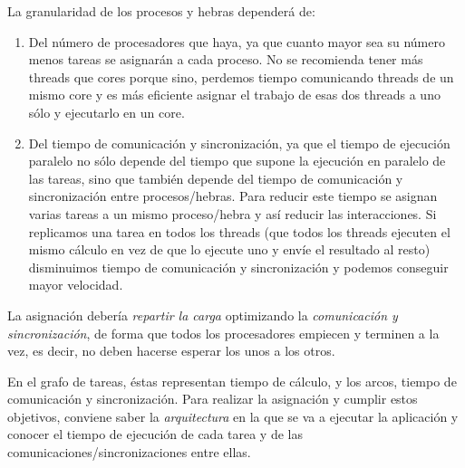 \documentclass[10pt,a4paper,spanish]{report}
\begin{document}
La granularidad de los procesos y hebras dependerá de:
\begin{enumerate}[\color{azul}{\bf $\heartsuit$}]
    \item Del número de procesadores que haya, ya que cuanto mayor sea su número menos tareas se asignarán a cada proceso. No se recomienda tener más threads que cores porque sino, perdemos tiempo comunicando threads de un mismo core y es más eficiente asignar el trabajo de esas dos threads a uno sólo y ejecutarlo en un core.
    \item Del tiempo de comunicación y sincronización, ya que el tiempo de ejecución paralelo no sólo depende del tiempo que supone la ejecución en paralelo de las tareas, sino que también depende del tiempo de comunicación y sincronización entre procesos/hebras. Para reducir este tiempo se asignan varias tareas a un mismo proceso/hebra y así reducir las interacciones. Si replicamos una tarea en todos los threads (que todos los threads ejecuten el mismo cálculo en vez de que lo ejecute uno y envíe el resultado al resto) disminuimos tiempo de comunicación y sincronización y podemos conseguir mayor velocidad.
\end{enumerate}

La asignación debería \textit{\textcolor[rgb]{0.2,0.4,0.8}{repartir la carga}} optimizando la \textcolor[rgb]{0.2,0.4,0.8}{\textit{comunicación y sincronización}}, de forma que todos los procesadores empiecen y terminen a la vez, es decir, no deben hacerse esperar los unos a los otros.

En el grafo de tareas, éstas representan tiempo de cálculo, y los arcos, tiempo de comunicación y sincronización. Para realizar la asignación y cumplir estos objetivos, conviene saber la \textcolor[rgb]{0.2,0.4,0.8}{\textit{arquitectura}} en la que se va a ejecutar la aplicación y conocer el tiempo de ejecución de cada tarea y de las comunicaciones/sincronizaciones entre ellas.
\end{document}
